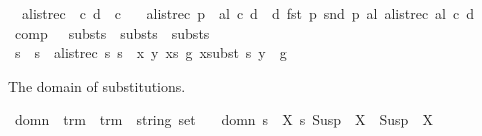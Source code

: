 \begin{isabellebody}
\ \ {\isachardoublequoteopen}alist{\isacharunderscore}{\kern0pt}rec\ {\isacharbrackleft}{\kern0pt}{\isacharbrackright}{\kern0pt}\ c\ d\ {\isacharequal}{\kern0pt}\ c{\isachardoublequoteclose}\ {\isacharbar}{\kern0pt}\isanewline
\ \ {\isachardoublequoteopen}alist{\isacharunderscore}{\kern0pt}rec\ {\isacharparenleft}{\kern0pt}p\ {\isacharhash}{\kern0pt}\ al{\isacharparenright}{\kern0pt}\ c\ d\ {\isacharequal}{\kern0pt}\ d\ {\isacharparenleft}{\kern0pt}fst\ p{\isacharparenright}{\kern0pt}\ {\isacharparenleft}{\kern0pt}snd\ p{\isacharparenright}{\kern0pt}\ al\ {\isacharparenleft}{\kern0pt}alist{\isacharunderscore}{\kern0pt}rec\ al\ c\ d{\isacharparenright}{\kern0pt}{\isachardoublequoteclose}\isanewline
\isanewline
{}\isamarkupfalse%
\ comp\ {\isacharcolon}{\kern0pt}{\isacharcolon}{\kern0pt}\ \ {\isachardoublequoteopen}substs\ {\isasymRightarrow}\ substs\ {\isasymRightarrow}\ substs{\isachardoublequoteclose}\ {\isacharparenleft}{\kern0pt}\ {\isacartoucheopen}{\isasymbullet}{\isacartoucheclose}\ {}{}{\isacharparenright}{\kern0pt}\ \isanewline
\ {\isachardoublequoteopen}s{}\ {\isasymbullet}\ s{}\ {\isasymequiv}\ alist{\isacharunderscore}{\kern0pt}rec\ s{}\ s{}\ {\isacharparenleft}{\kern0pt}{\isasymlambda}\ x\ y\ xs\ g{\isachardot}{\kern0pt}\ {\isacharparenleft}{\kern0pt}x{\isacharcomma}{\kern0pt}subst\ s{}\ y{\isacharparenright}{\kern0pt}\ {\isacharhash}{\kern0pt}\ g{\isacharparenright}{\kern0pt}{\isachardoublequoteclose}%
\begin{isamarkuptext}%
The domain of substitutions.%
\end{isamarkuptext}\isamarkuptrue%
\isamarkupfalse%
\ domn\ {\isacharcolon}{\kern0pt}{\isacharcolon}{\kern0pt}\ {\isachardoublequoteopen}{\isacharparenleft}{\kern0pt}trm\ {\isasymRightarrow}\ trm{\isacharparenright}{\kern0pt}\ {\isasymRightarrow}\ string\ set{\isachardoublequoteclose}\ \isanewline
\ \ {\isachardoublequoteopen}domn\ s\ {\isasymequiv}\ {\isacharbraceleft}{\kern0pt}X{\isachardot}{\kern0pt}\ {\isacharparenleft}{\kern0pt}s\ {\isacharparenleft}{\kern0pt}Susp\ {\isacharbrackleft}{\kern0pt}{\isacharbrackright}{\kern0pt}\ X{\isacharparenright}{\kern0pt}{\isacharparenright}{\kern0pt}\ {\isasymnoteq}\ {\isacharparenleft}{\kern0pt}Susp\ {\isacharbrackleft}{\kern0pt}{\isacharbrackright}{\kern0pt}\ X{\isacharparenright}{\kern0pt}{\isacharbraceright}{\kern0pt}{\isachardoublequoteclose}%
\begin{isamarkuptext}%

\end{isamarkuptext}
\end{isabellebody}
